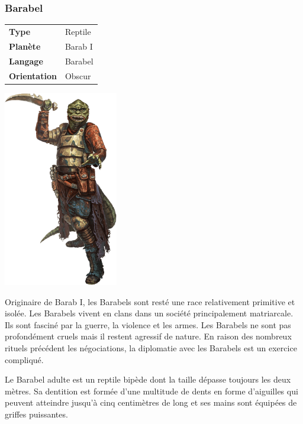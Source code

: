 \subsubsection{Barabel}
\begin{samepage}
	\begin{flushright}
		\begin{tabular}{ l l }
			\textbf{Type} 			& Reptile \\
		   	\textbf{Planète} 		& Barab I \\
		   	\textbf{Langage} 		& Barabel \\
		   	\textbf{Orientation} 	& Obscur \\
		\end{tabular}
	\end{flushright}

	\vspace{-5\baselineskip}
	\includegraphics[width=5cm]{img/personnages/races/barabel.png}
\end{samepage}

Originaire de Barab I, les Barabels sont resté une race relativement primitive et isolée. Les Barabels vivent en clans dans un société principalement matriarcale. Ils sont fasciné par la guerre, la violence et les armes. Les Barabels ne sont pas profondément cruels mais il restent agressif de nature. En raison des nombreux rituels précédent les négociations, la diplomatie avec les Barabels est un exercice compliqué.

Le Barabel adulte est un reptile bipède dont la taille dépasse toujours les deux mètres. Sa dentition est formée d’une multitude de dents en forme d’aiguilles qui peuvent atteindre jusqu’à cinq centimètres de long et ses mains sont équipées de griffes puissantes.

